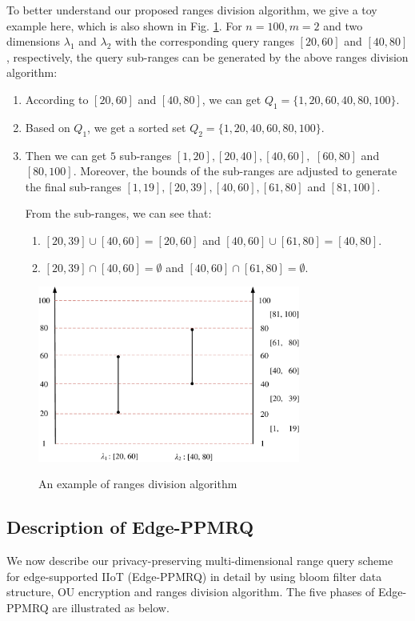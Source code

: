 \documentclass[IEEE JOURNAL OF BIOMEDICAL AND HEALTH INFORMATICS]{IEEEtran}
\begin{document}
To better understand our proposed ranges division algorithm, we give a toy example here, which is also shown in Fig. \ref{sections division algorithm}. For $n = 100, m = 2$ and two dimensions $\lambda_1$ and $\lambda_2$ with the corresponding query ranges $[20, 60]$ and $[40, 80]$, respectively, the query sub-ranges can be generated by the above ranges division algorithm:
\begin{enumerate}
	\item According to $[20, 60]$ and $[40, 80]$, we can get $Q_1=\{1, 20, 60, 40, 80, 100\}$.
	\item Based on $Q_1$, we get a sorted set $Q_2=\{1, 20, 40, 60, 80, 100\}$.
	\item Then we can get $5$ sub-ranges $[1, 20], [20, 40], [40, 60],$ $[60, 80]$ and $[80, 100]$. Moreover, the bounds of the sub-ranges are adjusted to generate the final sub-ranges $[1, 19], [20, 39], [40, 60], [61, 80]$ and $[81, 100]$.
	
From the sub-ranges, we can see that:
	\begin{enumerate}
		\item $[20,39] \cup [40, 60] = [20, 60]$ and $[40, 60] \cup [61, 80]=[40, 80]$.
		\item $[20,39] \cap [40, 60] = \emptyset$ and $[40, 60] \cap [61, 80]= \emptyset$.
	\end{enumerate}  
\end{enumerate}

\begin{figure}
	\centering
	\includegraphics[width=3.4in]{ranges_division_model}\\
	\caption{An example of ranges division algorithm}\label{sections division algorithm}
\end{figure}


\subsection{Description of Edge-PPMRQ}
We now describe our privacy-preserving multi-dimensional range query scheme for edge-supported IIoT (Edge-PPMRQ) in detail by using bloom filter data structure, OU encryption and ranges division algorithm. The five phases of Edge-PPMRQ are illustrated as below. 
\end{document}
